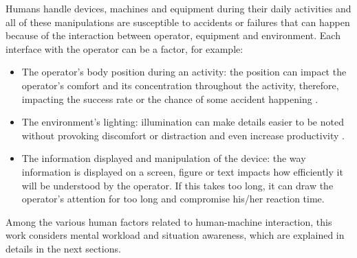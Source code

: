 Humans handle devices, machines and equipment during their daily activities and all of these manipulations are susceptible to accidents or failures that can happen because of the interaction between operator, equipment and environment. Each interface with the operator can be a factor, for example:

\begin{itemize}
    \item The operator's body position during an activity: the position can impact the operator’s comfort and its concentration throughout the activity, therefore, impacting the success rate or the chance of some accident happening  \cite{sanders1998human}.
    
    \item The environment's lighting: illumination can make details easier to be noted without provoking discomfort or distraction and even increase productivity  \cite{sanders1998human}.
    
    \item The information displayed and manipulation of the device: the way information is displayed on a screen, figure or text impacts how efficiently it will be understood by the operator. If this takes too long, it can draw the operator’s attention for too long and compromise his/her reaction time.
    
\end{itemize}

Among the various human factors related to human-machine interaction, this work considers mental workload and situation awareness, which are explained in details in the next sections.